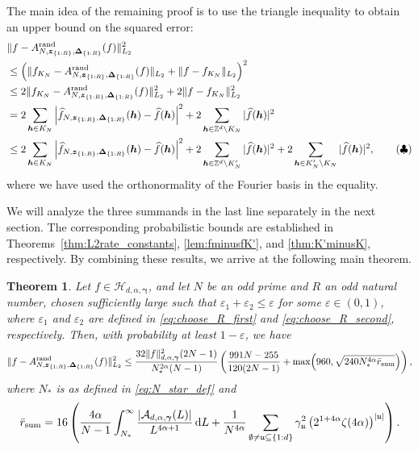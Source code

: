\documentclass[a4paper,11pt]{article}
\newtheorem{theorem}{Theorem}[section]
\newcommand{\rd}{\, \mathrm{d}}
\newcommand{\rand}{\mathrm{rand}}
\newcommand{\bsh}{\boldsymbol{h}}
\newcommand{\bsz}{\boldsymbol{z}}
\newcommand{\bsgamma}{\boldsymbol{\gamma}}
\newcommand{\bsDelta}{\boldsymbol{\Delta}}
\newcommand{\ZZ}{\mathbb{Z}}
\newcommand{\Acal}{\mathcal{A}}
\newcommand{\Hcal}{\mathcal{H}}
\newcommand{\fraku}{\mathfrak{u}}
\newcommand{\abs}[1]{\left\vert#1\right\vert}
\begin{document}
The main idea of the remaining proof is to use the triangle inequality to obtain an upper bound on the squared error:
\begin{align}
& \|f - A^{\rand}_{N,\bsz_{\{1{:}R\}},\bsDelta_{\{1{:}R\}}}(f)\|^2_{L_2} \notag \\
&\le \Big(\|f_{K_N} - A^{\rand}_{N,\bsz_{\{1{:}R\}},\bsDelta_{\{1{:}R\}}}(f)\|_{L_2} 
+ \|f - f_{K_N}\|_{L_2}\Big)^2 \notag \\
&\le 2 \|f_{K_N} - A^{\rand}_{N,\bsz_{\{1{:}R\}},\bsDelta_{\{1{:}R\}}}(f)\|^2_{L_2} 
+ 2 \|f - f_{K_N}\|^2_{L_2} \notag \\
&= 2 \sum_{\bsh \in K_N} 
\left| \widehat{f}_{N,\bsz_{\{1{:}R\}},\bsDelta_{\{1{:}R\}}}(\bsh) - \widehat{f}(\bsh) \right|^2
+ 2 \sum_{\bsh \in \ZZ^d \setminus K_N} |\widehat{f}(\bsh)|^2 \notag \\
&\le 2 \sum_{\bsh \in K_N} 
\left| \widehat{f}_{N,\bsz_{\{1{:}R\}},\bsDelta_{\{1{:}R\}}}(\bsh) - \widehat{f}(\bsh) \right|^2
+ 2 \sum_{\bsh \in \ZZ^d \setminus K'_N} |\widehat{f}(\bsh)|^2
+ 2 \sum_{\bsh \in K'_N \setminus K_N} |\widehat{f}(\bsh)|^2, \tag{$\clubsuit$} \label{eqn:errordecom}
\end{align}
where we have used the orthonormality of the Fourier basis in the equality.

We will analyze the three summands in the last line separately in the next section.
The corresponding probabilistic bounds are established in Theorems~\ref{thm:L2rate_constants}, \ref{lem:fminusfK'}, and \ref{thm:K'minusK}, respectively.
By combining these results, we arrive at the following main theorem.

\begin{theorem}\label{thm:combined_error}
Let $f\in \Hcal_{d,\alpha,\bsgamma}$, and let $N$ be an odd prime and $R$ an odd natural number, chosen sufficiently large such that $\varepsilon_1+\varepsilon_2\leq \varepsilon$ for some $\varepsilon\in (0,1)$, where $\varepsilon_1$ and $\varepsilon_2$ are defined in \eqref{eq:choose_R_first} and \eqref{eq:choose_R_second}, respectively. Then, with probability at least $1-\varepsilon$, we have
\[
  \|f-A^{\rand}_{N,\bsz_{\{1{:}R\}},\bsDelta_{\{1{:}R\}}}(f)\|^2_{L_2}
  \le \frac{32\|f\|^2_{d,\alpha,\bsgamma}(2N-1)}{N^{2\alpha}_*(N-1)}
  \left(\frac{991N-255}{120(2N-1)}
  + \max\!\left(960,\sqrt{240 N^{4\alpha}_*\Bar{r}_{\mathrm{sum}}}\right)\right),
\]
where $N_*$ is as defined in \eqref{eq:N_star_def} and
\begin{align}\label{eq:def_r_sum}
\Bar{r}_{\mathrm{sum}}=16\left(\frac{4\alpha}{N-1}\int_{N_*}^\infty \frac{ |\Acal_{d,\alpha,\bsgamma}(L)|}{L^{4\alpha+1} }\rd L
  +  \frac{1}{N^{4\alpha}} 
    \sum_{\emptyset \neq \fraku \subseteq \{1{:}d\}} \gamma^{2}_{\fraku} \left(2^{1+4\alpha}\zeta(4\alpha)\right)^{\abs{\fraku}}\right).
\end{align}
\end{theorem}
\end{document}
